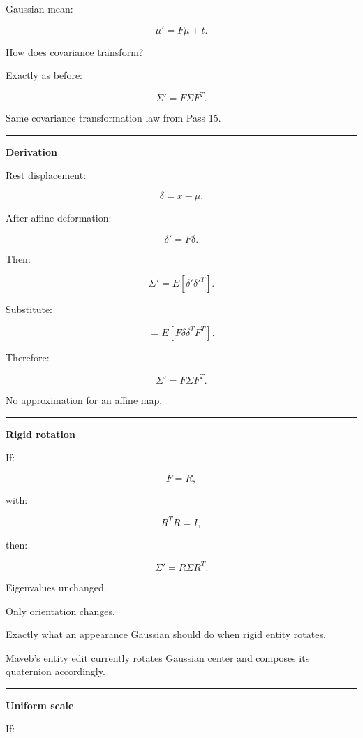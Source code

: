 Gaussian mean:

\[
\boxed{
\mu'
=
F\mu+t.
}
\]

How does covariance transform?

Exactly as before:

\[
\boxed{
\Sigma'
=
F
\Sigma
F^T.
}
\]

Same covariance transformation law from Pass 15.

\begin{center}\rule{0.5\linewidth}{0.5pt}\end{center}

\textbf{Derivation}

Rest displacement:

\[
\delta=x-\mu.
\]

After affine deformation:

\[
\delta'
=
F\delta.
\]

Then:

\[
\Sigma'
=
E[
\delta'\delta'^T
].
\]

Substitute:

\[
=
E[
F\delta
\delta^T
F^T
].
\]

Therefore:

\[
\boxed{
\Sigma'
=
F\Sigma F^T.
}
\]

No approximation for an affine map.

\begin{center}\rule{0.5\linewidth}{0.5pt}\end{center}

\textbf{Rigid rotation}

If:

\[
F=R,
\]

with:

\[
R^TR=I,
\]

then:

\[
\Sigma'
=
R\Sigma R^T.
\]

Eigenvalues unchanged.

Only orientation changes.

Exactly what an appearance Gaussian should do when rigid entity rotates.

Maveb's entity edit currently rotates Gaussian center and composes its quaternion accordingly.

\begin{center}\rule{0.5\linewidth}{0.5pt}\end{center}

\textbf{Uniform scale}

If:


